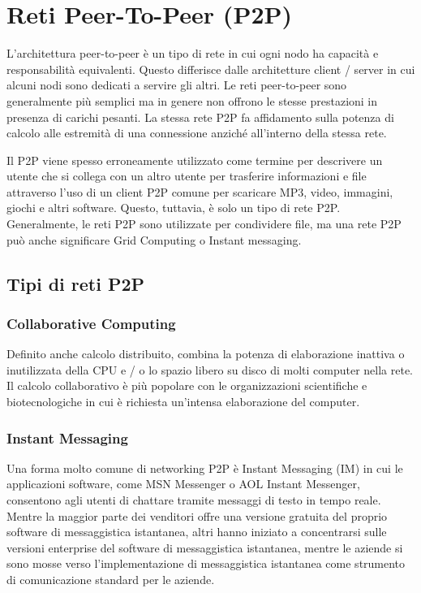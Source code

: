 \section{Reti Peer-To-Peer (P2P)}
L'architettura peer-to-peer è un tipo di rete in cui ogni nodo ha capacità e
responsabilità equivalenti. Questo differisce dalle architetture client /
server in cui alcuni nodi sono dedicati a servire gli altri. Le reti
peer-to-peer sono generalmente più semplici ma in genere non offrono le stesse
prestazioni in presenza di carichi pesanti. La stessa rete P2P fa affidamento
sulla potenza di calcolo alle estremità di una connessione anziché all'interno
della stessa rete.

Il P2P viene spesso erroneamente utilizzato come termine per descrivere un
utente che si collega con un altro utente per trasferire informazioni e file
attraverso l'uso di un client P2P comune per scaricare MP3, video, immagini,
giochi e altri software. Questo, tuttavia, è solo un tipo di rete P2P.
Generalmente, le reti P2P sono utilizzate per condividere file, ma una rete P2P
può anche significare Grid Computing o Instant messaging.

\subsection{Tipi di reti P2P}
\subsubsection{Collaborative Computing}
Definito anche calcolo distribuito, combina la potenza di elaborazione inattiva
o inutilizzata della CPU e / o lo spazio libero su disco di molti computer
nella rete. Il calcolo collaborativo è più popolare con le organizzazioni
scientifiche e biotecnologiche in cui è richiesta un'intensa elaborazione del
computer.
\subsubsection{Instant Messaging}
Una forma molto comune di networking P2P è Instant Messaging (IM) in cui le
applicazioni software, come MSN Messenger o AOL Instant Messenger,
consentono agli utenti di chattare tramite messaggi di testo in tempo reale.
Mentre la maggior parte dei venditori offre una versione gratuita del proprio
software di messaggistica istantanea, altri hanno iniziato a concentrarsi sulle
versioni enterprise del software di messaggistica istantanea, mentre le aziende
si sono mosse verso l'implementazione di messaggistica istantanea come
strumento di comunicazione standard per le aziende.

